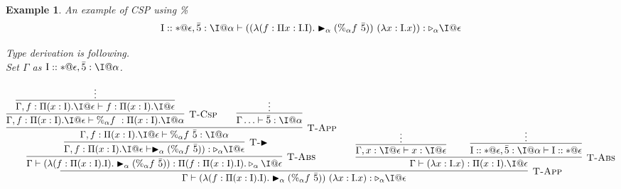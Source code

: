 \documentclass[9pt, a4paper]{extarticle}
\theoremstyle{break}
\newtheorem{ex}{Example}
\newcommand{\G}{\Gamma}
\newcommand{\V}{\vdash}
\newcommand{\TW}{\triangleright}
\newcommand{\TB}{\blacktriangleright}
\begin{document}
\begin{ex}
    \newcommand{\M}{\textrm{M}}
    \newcommand{\I}{\textrm{I}}
    An example of CSP using \% 
    \begin{align*}
        \I::*@\epsilon,\bar{5}:\I@\alpha\V ((\lambda(f:\Pi x:\I.\I).\TB_\alpha (\%_\alpha f\ \bar{5}))\ (\lambda x:\I.x)) : \TW_\alpha \I@\epsilon
    \end{align*}

    Type derivation is following.\\
    Set $\G$ as $\I::*@\epsilon,\bar{5}:\I@\alpha$.
    \begin{center}
        $$
        \infer[\textsc{T-App}]
        {\G\V (\lambda(f:\Pi (x:\I).\I).\TB_\alpha (\%_\alpha f\ \bar{5}))\ (\lambda x:\I.x) : \TW_\alpha\I@\epsilon}
        {\infer[\textsc{T-Abs}]
            {\G\V (\lambda(f:\Pi (x:\I).\I).\TB_\alpha (\%_\alpha f\ \bar{5})):\Pi (f:\Pi (x:\I).\I).\TW_\alpha \I@\epsilon}
            {\infer[\textsc{T-$\TB$}]
                {\G ,f:\Pi (x:\I).\I@\epsilon \V \TB_\alpha (\%_\alpha f\ \bar{5})):\TW_\alpha \I@\epsilon}
                {\infer[\textsc{T-App}]
                    {\G ,f:\Pi (x:\I).\I@\epsilon \V\%_\alpha f\ \bar{5}: \I@\alpha}
                    {\infer[\textsc{T-Csp}]
                        {\G ,f:\Pi (x:\I).\I@\epsilon \V \%_\alpha f\ : \Pi (x:\I).\I@\alpha}
                        {\infer[]{\G ,f:\Pi (x:\I).\I@\epsilon \V f: \Pi (x:\I).\I@\epsilon}{\vdots}}
                        \andalso
                        \infer[]
                        {\G\ldots \V \bar{5}: \I@\alpha}
                        {\vdots}
                    }
                }
            }\andalso
            \infer[\textsc{T-Abs}]
            {\G\V(\lambda x:\I.x):\Pi (x:\I).\I@\epsilon}
        {
    \infer[]{\G,x:\I@\epsilon\V x:\I@\epsilon}{\vdots} \andalso \infer[]{\I::*@\epsilon,\bar{5}:\I@\alpha\V\I::*@\epsilon}{\vdots}}}
        $$
    \end{center}
\end{ex}
\end{document}

